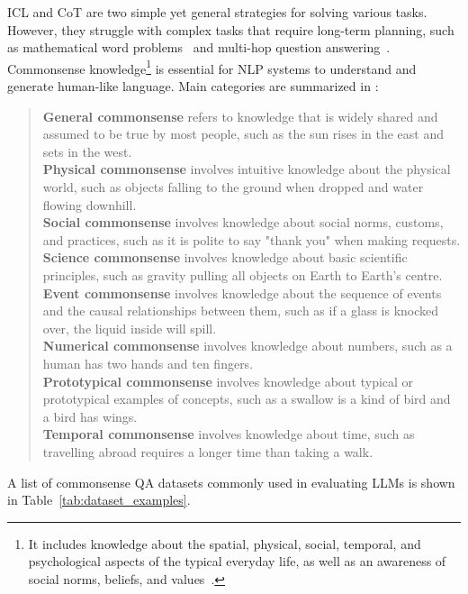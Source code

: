 ICL and CoT are two simple yet general strategies for solving various tasks.
However, they struggle with complex tasks that require long-term planning, such as mathematical word problems~\cite{qian2022limitations} and multi-hop question answering~\cite{bian2024chatgpt}.
Commonsense knowledge\footnote{It includes knowledge about the spatial,
	physical, social, temporal, and psychological aspects of the typical everyday life, as well as an awareness of social norms, beliefs, and values~\cite{liu2004conceptnet}.} is essential for NLP systems to understand and generate human-like language.
Main categories are summarized in \textcite{bian2024chatgpt}:
\begin{quote}
	\textbf{General commonsense} refers to knowledge that is widely shared and assumed to be true by most people, such as the sun rises in the east and sets in the west.\\
	\textbf{Physical commonsense} involves intuitive knowledge about the physical world, such as objects falling to the ground when dropped and water flowing downhill.\\
	\textbf{Social commonsense} involves knowledge about social norms, customs, and practices, such as it is polite to say "thank you" when
	making requests.\\
	\textbf{Science commonsense} involves knowledge about basic scientific principles, such as gravity pulling all objects on Earth to Earth’s centre.\\
	\textbf{Event commonsense} involves knowledge about the sequence of events and the causal relationships between them, such as if a glass is knocked over, the liquid inside will spill.\\
	\textbf{Numerical commonsense} involves knowledge about numbers, such as a human has two hands and ten fingers.\\
	\textbf{Prototypical commonsense} involves knowledge about typical or prototypical examples of concepts, such as a swallow is a kind of bird and a bird has wings.\\
	\textbf{Temporal commonsense} involves knowledge about time, such as travelling abroad requires a longer time than taking a walk.
\end{quote}
A list of commonsense QA datasets commonly used in evaluating LLMs is shown in Table~\ref{tab:dataset_examples}.
